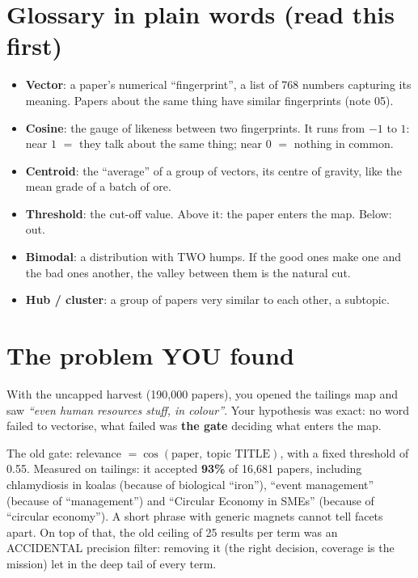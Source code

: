 \documentclass[11pt,a4paper]{article}
\begin{document}

\section{Glossary in plain words (read this first)}

\begin{itemize}
  \item \textbf{Vector}: a paper's numerical ``fingerprint'', a list of 768 numbers capturing
        its meaning. Papers about the same thing have similar fingerprints (note 05).
  \item \textbf{Cosine}: the gauge of likeness between two fingerprints. It runs from $-1$ to
        $1$: near $1$ $=$ they talk about the same thing; near $0$ $=$ nothing in common.
  \item \textbf{Centroid}: the ``average'' of a group of vectors, its centre of gravity, like
        the mean grade of a batch of ore.
  \item \textbf{Threshold}: the cut-off value. Above it: the paper enters the map. Below: out.
  \item \textbf{Bimodal}: a distribution with TWO humps. If the good ones make one and the bad
        ones another, the valley between them is the natural cut.
  \item \textbf{Hub / cluster}: a group of papers very similar to each other, a subtopic.
\end{itemize}

\section{The problem YOU found}

With the uncapped harvest (190,000 papers), you opened the tailings map and saw \emph{``even
human resources stuff, in colour''}. Your hypothesis was exact: no word failed to vectorise,
what failed was \textbf{the gate} deciding what enters the map.

The old gate: relevance $= \cos(\mbox{paper},\ \mbox{topic TITLE})$, with a fixed threshold of
0.55. Measured on tailings: it accepted \textbf{93\%} of 16,681 papers, including chlamydiosis
in koalas (because of biological ``iron''), ``event management'' (because of ``management'')
and ``Circular Economy in SMEs'' (because of ``circular economy''). A short phrase with generic
magnets cannot tell facets apart. On top of that, the old ceiling of 25 results per term was an
ACCIDENTAL precision filter: removing it (the right decision, coverage is the mission) let in
the deep tail of every term.
\end{document}
